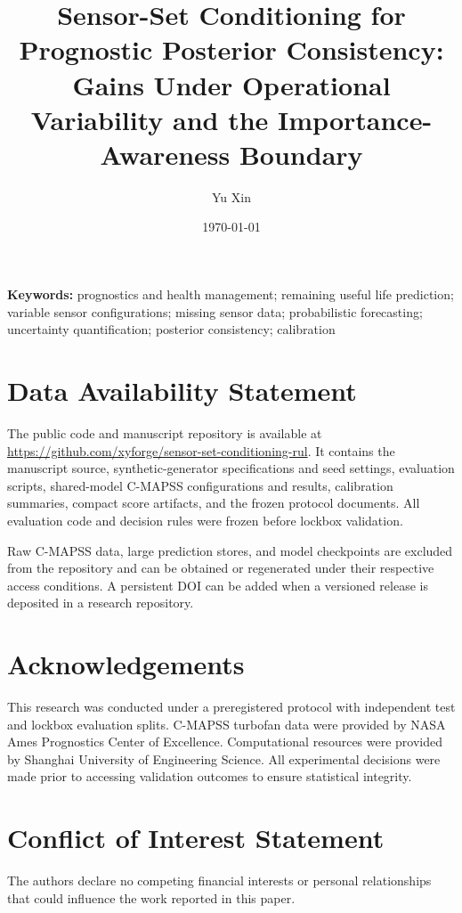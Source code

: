 \documentclass[11pt]{article}
\title{Sensor-Set Conditioning for Prognostic Posterior Consistency:\\
Gains Under Operational Variability and the Importance-Awareness Boundary}
\author{Yu Xin}
\date{\today}
\begin{document}
\maketitle

\begin{abstract}

\end{abstract}

\noindent\textbf{Keywords:} prognostics and health management; remaining useful life prediction;
variable sensor configurations; missing sensor data; probabilistic forecasting;
uncertainty quantification; posterior consistency; calibration







\section*{Data Availability Statement}

The public code and manuscript repository is available at
\url{https://github.com/xyforge/sensor-set-conditioning-rul}. It contains the
manuscript source, synthetic-generator specifications and seed settings,
evaluation scripts, shared-model C-MAPSS configurations and results, calibration
summaries, compact score artifacts, and the frozen protocol documents. All
evaluation code and decision rules were frozen before lockbox validation.

Raw C-MAPSS data, large prediction stores, and model checkpoints are excluded
from the repository and can be obtained or regenerated under their respective
access conditions. A persistent DOI can be added when a versioned release is
deposited in a research repository.

\section*{Acknowledgements}

This research was conducted under a preregistered protocol with independent test and lockbox evaluation splits. C-MAPSS turbofan data were provided by NASA Ames Prognostics Center of Excellence. Computational resources were provided by Shanghai University of Engineering Science. All experimental decisions were made prior to accessing validation outcomes to ensure statistical integrity.

\section*{Conflict of Interest Statement}

The authors declare no competing financial interests or personal relationships that could influence the work reported in this paper.



\end{document}
